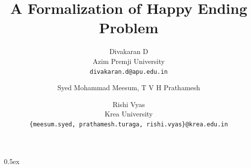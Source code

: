 \documentclass[11pt,a4paper]{article}
\begin{document}
\title{A Formalization of Happy Ending Problem}
\author{
    Divakaran D \\
    \small Azim Premji University \\
    \small \texttt{divakaran.d@apu.edu.in} \\
    \and
    Syed Mohammad Meesum, T V H Prathamesh \and Rishi Vyas \\
    \small Krea University \\
    \small \texttt{\{meesum.syed, prathamesh.turaga, rishi.vyas\}@krea.edu.in}
}

\maketitle

\tableofcontents

\parindent 0pt\parskip 0.5ex



%
%
\end{document}
